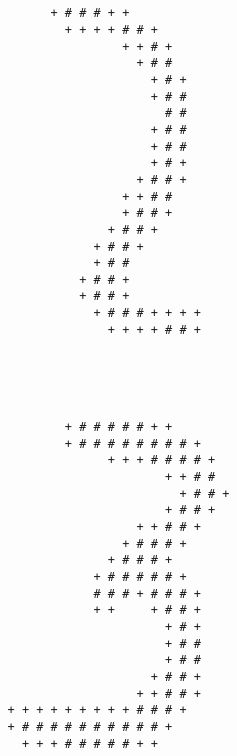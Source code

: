 \begin{multicols*}{2}
\begin{Verbatim}[samepage=true]
\end{Verbatim}
\begin{Verbatim}[samepage=true]
                                                        
                                                        
                + # # # + +                             
                  + + + + # # +                         
                          + + # +                       
                            + # #                       
                              + # +                     
                              + # #                     
                                # #                     
                              + # #                     
                              + # #                     
                              + # +                     
                            + # # +                     
                          + + # #                       
                          + # # +                       
                        + # # +                         
                      + # # +                           
                      + # #                             
                    + # # +                             
                    + # # +                             
                      + # # # + + + +                   
                        + + + + # # +                   
                                                        
                                                        
\end{Verbatim}
\begin{Verbatim}[samepage=true]
                                                        
                                                        
                  + # # # # # + +                       
                  + # # # # # # # # +                   
                        + + + # # # # +                 
                                + + # #                 
                                  + # # +               
                                + # # +                 
                            + + # # +                   
                          + # # # +                     
                        + # # # +                       
                      + # # # # # +                     
                      # # # + # # # +                   
                      + +     + # # +                   
                                + # +                   
                                + # #                   
                                + # #                   
                              + # # +                   
                            + + # # +                   
          + + + + + + + + + # # # +                     
          + # # # # # # # # # # +                       
            + + + # # # # # + +                         
                                                        

\end{Verbatim}
\end{multicols*}
